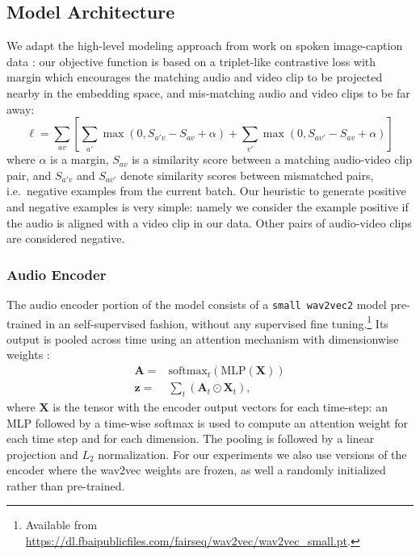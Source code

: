 \subsection{Model Architecture}
\label{sec:model}
We adapt the high-level modeling approach from work on spoken
image-caption data
\citep{harwath2016unsupervised,chrupala-etal-2017-representations}:
our objective function is based on a triplet-like contrastive loss with margin which
encourages the matching audio and video clip to be projected nearby in
the embedding space, and mis-matching audio and video clips to be far
away:
\begin{dmath}
  \ell = \sum_{av}\left[\sum_{a'} \max(0, S_{a'v} - S_{av} +
    \alpha) + \sum_{v'} \max(0, S_{av'} - S_{av} + \alpha) \right]
  \label{eq:triplet}
\end{dmath}
where $\alpha$ is a margin, $S_{av}$ is a similarity score between a
matching audio-video clip pair, and $S_{a'v}$ and $S_{av'}$ denote
similarity scores between mismatched pairs, i.e.\ negative examples
from the current batch. Our heuristic to generate positive and
negative examples is very simple: namely we consider the example
positive if the audio is aligned with a video clip in our
data. Other pairs of audio-video clips are considered negative.

\subsubsection{Audio Encoder}
The audio encoder portion of the model consists of a {\tt small
  wav2vec2} model \citep{wav2vec2} pre-trained in an self-supervised
fashion, without any supervised fine tuning.\footnote{Available from
  \url{https://dl.fbaipublicfiles.com/fairseq/wav2vec/wav2vec_small.pt}.}
Its output is pooled across time using an attention mechanism with
dimensionwise weights \citep{Merkx2019}:
\begin{equation}
  \begin{aligned}
    \mathbf{A} = & \mathrm{softmax}_t\left(\mathrm{MLP}(\mathbf{X})\right)\\
    \mathbf{z} = & \sum_t \left( \mathbf{A}_{t} \odot \mathbf{X}_{t} \right),
  \end{aligned}
  \label{eq:att-pool}
\end{equation}
where $\mathbf{X}$ is the tensor with the encoder output vectors for
each time-step: an MLP followed by a time-wise
softmax is used to compute an attention weight for each time step and for each
dimension.
The pooling is followed by a linear projection and $L_2$
normalization. For our experiments we also use versions of the encoder
where the wav2vec weights are frozen, as well a randomly initialized
rather than pre-trained.



